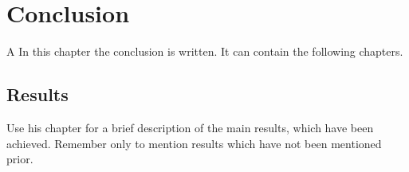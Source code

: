 \chapter{Conclusion}

A In this chapter the conclusion is written. It can contain the following chapters.

\section{Results}
Use his chapter for a brief description of the main results, which have been achieved. Remember only to mention results which have not been mentioned prior. 

